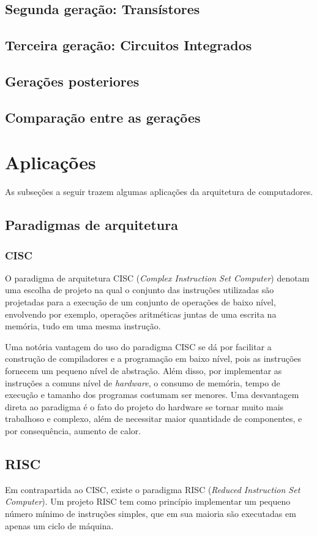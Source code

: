 \documentclass{article}
\begin{document}
\subsection{Segunda geração: Transístores}
\subsection{Terceira geração: Circuitos Integrados}
\subsection{Gerações posteriores}
\subsection{Comparação entre as gerações}

\section{Aplicações} 
As subseções a seguir trazem algumas aplicações da arquitetura de computadores.
\subsection{Paradigmas de arquitetura}

\subsubsection{CISC}
O paradigma de arquitetura CISC (\textit{Complex Instruction Set Computer})
denotam uma escolha de projeto na qual o conjunto das instruções utilizadas são
projetadas para a execução de um conjunto de operações de baixo nível,
envolvendo por exemplo, operações aritméticas juntas de uma escrita na memória,
tudo em uma mesma instrução.

Uma notória vantagem do uso do paradigma CISC se dá por facilitar a construção
de compiladores e a programação em baixo nível, pois as instruções fornecem um
pequeno nível de abstração. Além disso, por implementar as instruções a comuns
nível de \textit{hardware}, o consumo de memória, tempo de execução e tamanho dos
programas costumam ser menores. Uma desvantagem direta ao paradigma é o fato do
projeto do hardware se tornar muito mais trabalhoso e complexo, além de
necessitar maior quantidade de componentes, e por consequência, aumento de
calor.

\subsection{RISC}
Em contrapartida ao CISC, existe o paradigma RISC (\textit{Reduced Instruction
Set Computer}). Um projeto RISC tem como princípio implementar um pequeno número
mínimo de instruções simples, que em sua maioria são executadas em apenas um
ciclo de máquina.
\end{document}
